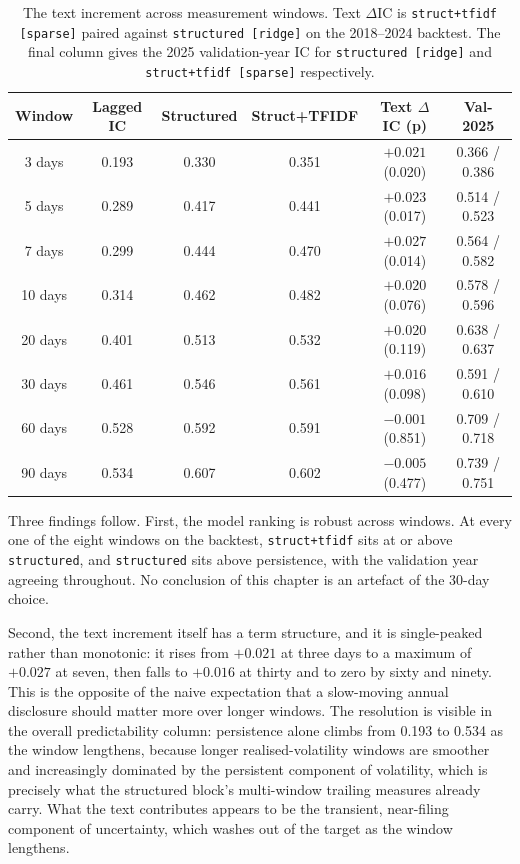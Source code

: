 \documentclass[logo,msc,ai]{infthesis}        %
\begin{document}
\begin{table}[h]
\centering
\footnotesize
\caption{The text increment across measurement windows. Text $\Delta$IC is \texttt{struct+tfidf [sparse]} paired against \texttt{structured [ridge]} on the 2018--2024 backtest. The final column gives the 2025 validation-year IC for \texttt{structured [ridge]} and \texttt{struct+tfidf [sparse]} respectively.}
\label{tab:horizon}
\footnotesize
\begin{tabular}{@{}cccccc@{}}
\toprule
\textbf{Window} & \textbf{Lagged IC} & \textbf{Structured} & \textbf{Struct+TFIDF} & \textbf{Text $\Delta$IC (p)} & \textbf{Val-2025} \\
\midrule
3 days  & 0.193 & 0.330 & 0.351 & $+0.021$ (0.020) & 0.366 / 0.386 \\
5 days  & 0.289 & 0.417 & 0.441 & $+0.023$ (0.017) & 0.514 / 0.523 \\
7 days  & 0.299 & 0.444 & 0.470 & $+0.027$ (0.014) & 0.564 / 0.582 \\
10 days & 0.314 & 0.462 & 0.482 & $+0.020$ (0.076) & 0.578 / 0.596 \\
20 days & 0.401 & 0.513 & 0.532 & $+0.020$ (0.119) & 0.638 / 0.637 \\
30 days & 0.461 & 0.546 & 0.561 & $+0.016$ (0.098) & 0.591 / 0.610 \\
60 days & 0.528 & 0.592 & 0.591 & $-0.001$ (0.851) & 0.709 / 0.718 \\
90 days & 0.534 & 0.607 & 0.602 & $-0.005$ (0.477) & 0.739 / 0.751 \\
\bottomrule
\end{tabular}
\end{table}

Three findings follow. First, the model ranking is robust across windows. At every one of the eight windows on the backtest, \texttt{struct+tfidf} sits at or above \texttt{structured}, and \texttt{structured} sits above persistence, with the validation year agreeing throughout. No conclusion of this chapter is an artefact of the 30-day choice.

Second, the text increment itself has a term structure, and it is single-peaked rather than monotonic: it rises from $+0.021$ at three days to a maximum of $+0.027$ at seven, then falls to $+0.016$ at thirty and to zero by sixty and ninety. This is the opposite of the naive expectation that a slow-moving annual disclosure should matter more over longer windows. The resolution is visible in the overall predictability column: persistence alone climbs from 0.193 to 0.534 as the window lengthens, because longer realised-volatility windows are smoother and increasingly dominated by the persistent component of volatility, which is precisely what the structured block's multi-window trailing measures already carry. What the text contributes appears to be the transient, near-filing component of uncertainty, which washes out of the target as the window lengthens.
\end{document}

